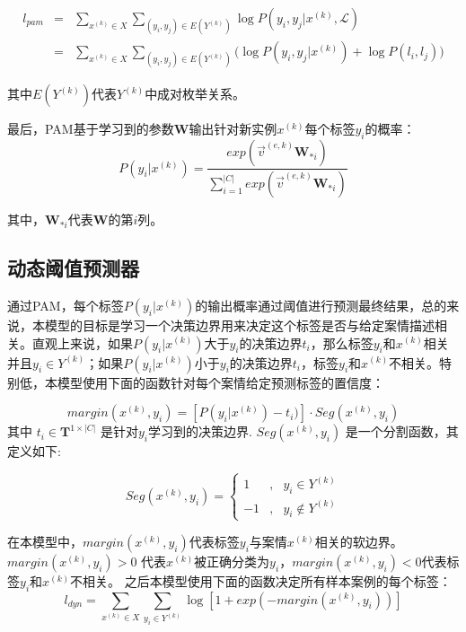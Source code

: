 \begin{eqnarray}\label{eq:pam}
l_{pam}&=&\sum_{x^{(k)}\in X}\sum_{(y_i,y_j)\in E(Y^{(k)})}\log P(y_i,y_j|x^{(k)},\mathcal{L})\\\nonumber
&=&\sum_{x^{(k)}\in X}\sum_{(y_i,y_j)\in E(Y^{(k)})}\Big(\log P(y_i,y_j|x^{(k)})+\log P(l_i,l_j)\Big)
\end{eqnarray}

其中$ E(Y^{(k)})$代表$Y^{(k)}$中成对枚举关系。

最后，PAM基于学习到的参数$\textbf{W}$输出针对新实例$x^{(k)}$每个标签$y_i$的概率：
$$
P(y_i|x^{(k)})=\frac{exp(\vec{v}^{(e,k)}\textbf{W}_{*i})}{\sum_{i=1}^{|C|}exp(\vec{v}^{(e,k)}\textbf{W}_{*i})}
$$

其中，$\textbf{W}_{*i}$代表$\textbf{W}$的第$i$列。

\subsection{动态阈值预测器}
通过PAM，每个标签$P(y_i|x^{(k)})$的输出概率通过阈值进行预测最终结果，总的来说，本模型的目标是学习一个决策边界用来决定这个标签是否与给定案情描述相关。直观上来说，如果$P(y_i|x^{(k)})$大于$y_i$的决策边界$t_i$，那么标签$y_i$和$x^{(k)}$相关并且$y_i\in Y^{(k)}$；如果$P(y_i|x^{(k)})$小于$y_i$的决策边界$t_i$，标签$y_i$和$x^{(k)}$不相关。特别低，本模型使用下面的函数针对每个案情给定预测标签的置信度：

\begin{equation}
margin(x^{(k)},y_i)=[P(y_i|x^{(k)})-t_i)]\cdot Seg(x^{(k)},y_i)
\end{equation}
其中 $t_i\in \textbf{T}^{1\times |C|}$ 是针对$y_i$学习到的决策边界. $Seg(x^{(k)},y_i)$ 是一个分割函数，其定义如下:


\begin{displaymath}
Seg(x^{(k)},y_i)=\left\{
\begin{aligned}
1 & , & y_i\in Y^{(k)} \\
-1 &, & y_i\notin Y^{(k)}
\end{aligned}
\right.
\end{displaymath}

在本模型中，$margin(x^{(k)},y_i)$代表标签$y_i$与案情$x^{(k)}$相关的软边界。$margin(x^{(k)},y_i)>0$ 代表$x^{(k)}$被正确分类为$y_i$，$margin(x^{(k)},y_i)<0$代表标签$y_i$和$x^{(k)}$不相关。
之后本模型使用下面的函数决定所有样本案例的每个标签：
\begin{equation}\label{eq:dyn}
l_{dyn}=\sum_{x^{(k)}\in X}\sum_{y_i\in Y^{(k)}}\log\left[1+exp(-margin(x^{(k)},y_i))\right]
\end{equation}

